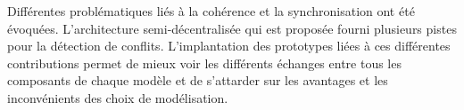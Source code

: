 Différentes problématiques liés à la cohérence et la synchronisation ont été 
évoquées. L'architecture semi-décentralisée qui est proposée fourni plusieurs 
pistes pour la détection de conflits. L'implantation des prototypes liées à ces 
différentes contributions permet de mieux voir les différents échanges entre tous 
les composants de chaque modèle et de s'attarder sur les avantages et les 
inconvénients des choix de modélisation.
